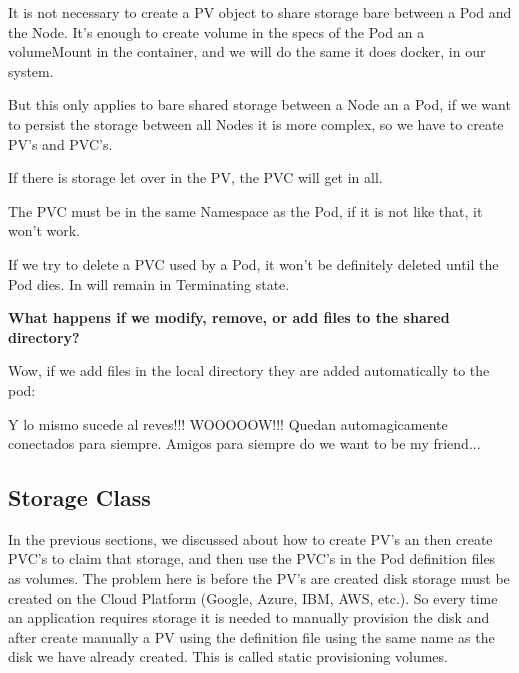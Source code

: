 \documentclass{article}
\newenvironment{blocktemplateIII}[1]{%
    \tcolorbox[beamer,%
    noparskip,breakable,
    ,colframe=Red,%
    colbacklower=LimeGreen!75!LightGreen,%
    title=#1]}%
    {\endtcolorbox}
\begin{document}
\begin{blocktemplateIII}{WARNING}
It is not necessary to create a PV object to share storage bare between a Pod and the Node. It's enough to create volume in the specs of the Pod an a volumeMount in the container, and we will do the same it does docker, in our system. 

But this only applies to bare shared storage between a Node an a Pod, if we want to persist the storage between all Nodes it is more complex, so we have to create PV's and PVC's.
\end{blocktemplateIII}

\begin{blocktemplateIII}{WARNING}
If there is storage let over in the PV, the PVC will get in all.
\end{blocktemplateIII}

\begin{blocktemplateIII}{WARNING}
The PVC must be in the same Namespace as the Pod, if it is not like that, it won't work.
\end{blocktemplateIII}

\begin{blocktemplateIII}{WARNING}
If we try to delete a PVC used by a Pod, it won't be definitely deleted until the Pod dies. In will remain in Terminating state.
\end{blocktemplateIII}

\textbf{What happens if we modify, remove, or add files to the shared directory?}

Wow, if we add files in the local directory they are added automatically to the pod:

Y lo mismo sucede al reves!!! WOOOOOW!!! Quedan automagicamente conectados para siempre. Amigos para siempre do we want to be my friend...

\subsection{Storage Class}

In the previous sections, we discussed about how to create PV's an then create PVC's to claim that storage, and then use the PVC's in the Pod definition files as volumes. The problem here is before the PV's are created disk storage must be created on the Cloud Platform (Google, Azure, IBM, AWS, etc.). So every time an application requires storage it is needed to manually provision the disk and after create manually a PV using the definition file using the same name as the disk we have already created. This is called static provisioning volumes.
\end{document}

